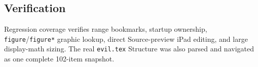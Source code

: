 \documentclass[a4paper]{article}
\begin{document}
\begin{preview}
      \section{Verification}
      Regression coverage verifies range bookmarks, startup ownership,
      \texttt{figure}/\texttt{figure*} graphic lookup, direct Source-preview
      iPad editing, and large display-math sizing. The real
      \texttt{evil.tex} Structure was also parsed and navigated as one
      complete 102-item snapshot.
   \end{preview}

   
   
\end{document}
